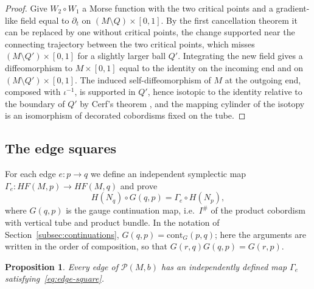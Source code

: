 \documentclass[11pt]{amsart}
\newtheorem{proposition}[theorem]{Proposition}
\theoremstyle{definition}
\theoremstyle{remark}
\theoremstyle{plain}
\numberwithin{equation}{section}
\newcommand{\cP}{\mathcal{P}}
\newcommand{\Ish}{I^{\#}}
\newcommand{\HF}{\mathit{HF}}
\begin{document}
\begin{proof}
Give $W_2\circ W_1$ a Morse function with the two critical points and a
gradient-like field equal to $\partial_t$ on $(M\setminus Q)\times[0,1]$. By the
first cancellation theorem \cite[Theorem~5.4]{Milnor-h-cob} it can be replaced
by one without critical points, the change supported near the connecting
trajectory between the two critical points, which misses $(M\setminus Q')\times
[0,1]$ for a slightly larger ball $Q'$. Integrating the new field gives a
diffeomorphism to $M\times[0,1]$ equal to the identity on the incoming end and
on $(M\setminus Q')\times[0,1]$. The induced self-diffeomorphism of $M$ at the
outgoing end, composed with $\iota^{-1}$, is supported in $Q'$, hence isotopic
to the identity relative to the boundary of $Q'$ by Cerf's theorem
\cite{Cerf}, and the mapping cylinder of the isotopy is an isomorphism of
decorated cobordisms fixed on the tube.
\end{proof}

\subsection{The edge squares}

For each edge $e\colon p\to q$ we define an independent symplectic map
$\Gamma_e\colon\HF(M,p)\to\HF(M,q)$ and prove
\begin{equation}\label{eq:edge-square}
H(N_q)\circ G(q,p)=\Gamma_e\circ H(N_p),
\end{equation}
where $G(q,p)$ is the gauge continuation map, i.e.\ $\Ish$ of the product
cobordism with vertical tube and product bundle. In the notation of
Section~\ref{subsec:continuations}, $G(q,p)=\mathrm{cont}_G(p,q)$; here the arguments are written
in the order of composition, so that $G(r,q)G(q,p)=G(r,p)$.

\begin{proposition}\label{prop:pres-squares}
Every edge of $\cP(M,b)$ has an independently defined map $\Gamma_e$
satisfying~\eqref{eq:edge-square}.
\end{proposition}
\end{document}
